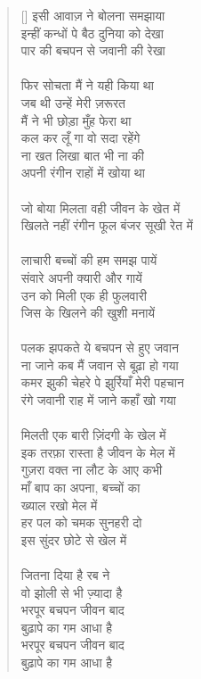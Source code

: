 \begin{verse}[\versewidth]
{इसी आवाज़ ने बोलना समझाया\\
इन्हीं कन्धों पे बैठ दुनिया को देखा\\
पार की बचपन से जवानी की रेखा\\
\\
फिर सोचता मैं ने यही किया था\\
जब थी उन्हें मेरी ज़रूरत\\
मैं ने भी छोड़ा मुँह फेरा था\\
कल कर लूँ गा वो सदा रहेंगे\\
ना खत लिखा बात भी ना की\\
अपनी रंगीन राहों में खोया था\\
\\
जो बोया मिलता वही जीवन के खेत में\\
खिलते नहीं रंगीन फूल बंजर सूखी रेत में\\
\\
लाचारी बच्चों की हम समझ पायें\\
संवारे अपनी क्यारी और गायें\\
उन को मिली एक ही फुलवारी\\
जिस के खिलने की खुशी मनायें\\
\\
पलक झपकते ये बचपन से हुए जवान\\
ना जाने कब मैं जवान से बूढ़ा हो गया\\
कमर झुकी चेहरे पे झुर्रियाँ मेरी पहचान\\
रंगे जवानी राह में जाने कहाँ खो गया\\
\\
मिलती एक बारी ज़िंदगी के खेल में\\
इक तरफ़ा रास्ता है जीवन के मेल में\\
गुज़रा वक्त ना लौट के आए कभी\\
माँ बाप का अपना, बच्चों का\\
ख्याल रखो मेल में\\
हर पल को चमक सुनहरी दो\\
इस सुंदर छोटे से खेल में\\
\\
जितना दिया है रब ने\\
वो झोली से भी ज़्यादा है\\
भरपूर बचपन जीवन बाद\\
बुढ़ापे का गम आधा है\\
भरपूर बचपन जीवन बाद\\
बुढ़ापे का गम आधा है
}\end{verse}

